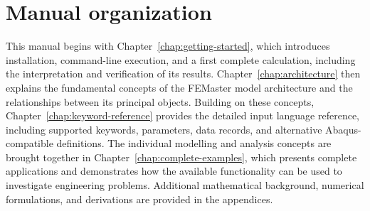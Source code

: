 \section{Manual organization}

This manual begins with Chapter~\ref{chap:getting-started}, which introduces installation, command-line execution, and a first complete calculation, including the interpretation and verification of its results. Chapter~\ref{chap:architecture} then explains the fundamental concepts of the FEMaster model architecture and the relationships between its principal objects. Building on these concepts, Chapter~\ref{chap:keyword-reference} provides the detailed input language reference, including supported keywords, parameters, data records, and alternative Abaqus-compatible definitions. The individual modelling and analysis concepts are brought together in Chapter~\ref{chap:complete-examples}, which presents complete applications and demonstrates how the available functionality can be used to investigate engineering problems. Additional mathematical background, numerical formulations, and derivations are provided in the appendices.
